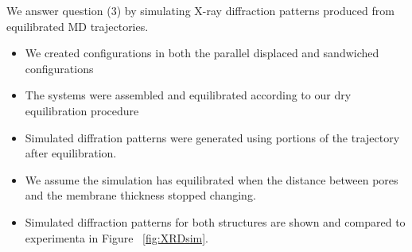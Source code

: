 \documentclass{article}
\newcommand{\angstrom}{\textup{\AA}}
\begin{document}


  We answer question (3) by simulating X-ray diffraction patterns produced from
  equilibrated MD trajectories.
  \begin{itemize}
	\item We created configurations in both the parallel displaced and sandwiched
	configurations
        \item The systems were assembled and equilibrated according to our dry equilibration procedure
        \item Simulated diffration patterns were generated using portions of the
        trajectory after equilibration.
        \item We assume the simulation has equilibrated when the distance between
        pores and the membrane thickness stopped changing. %
        \item Simulated diffraction patterns for both structures are shown and 
	compared to experimenta in Figure ~\ref{fig:XRDsim}.
  \end{itemize}
%
\end{document}

